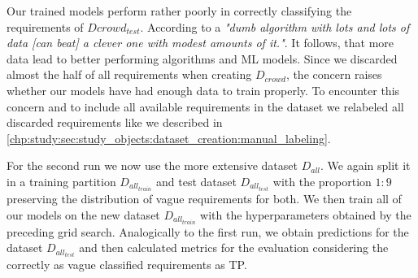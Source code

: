 Our trained models perform rather poorly in correctly classifying the requirements of $D{crowd_{test}}$.
According to \textcite{Domingos:2012} a \textit{"dumb algorithm with lots and lots of data [can beat] a clever one with modest amounts of it."}.
It follows, that more data lead to better performing algorithms and \ac{ML} models.
Since we discarded almost the half of all requirements when creating $D_{crowd}$, the concern raises whether our models have had enough data to train properly.
To encounter this concern and to include all available requirements in the dataset we relabeled all discarded requirements like we described in \cref{chp:study:sec:study_objects:dataset_creation:manual_labeling}.

For the second run we now use the more extensive dataset $D_{all}$.
We again split it in a training partition $D_{all_{train}}$ and test dataset $D_{all_{test}}$ with the proportion $1\mathrm{:}9$ preserving the distribution of vague requirements for both.
We then train all of our models on the new dataset $D_{all_{train}}$ with the hyperparameters obtained by the preceding grid search.
Analogically to the first run, we obtain predictions for the dataset $D_{all_{test}}$ and then calculated metrics for the evaluation considering the correctly as vague classified requirements as \ac{TP}.
